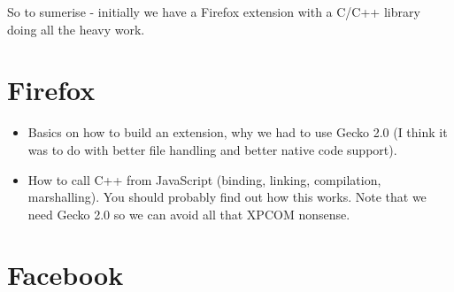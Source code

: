     So to sumerise - initially we have a Firefox extension with a C/C++ library doing all the heavy work.

\section{Firefox}

\begin{itemize}
    \item Basics on how to build an extension, why we had to use Gecko 2.0 (I think it was to do with better file handling and better native code support).

    \item How to call C++ from JavaScript (binding, linking, compilation, marshalling). You should probably find out how this works. Note that we need Gecko 2.0 so we can avoid all that XPCOM nonsense.
\end{itemize}

\section{Facebook}

